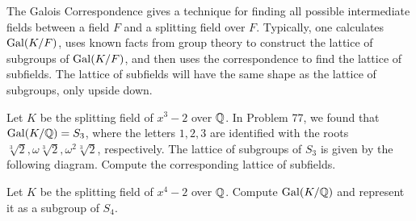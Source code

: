 The Galois Correspondence gives a technique for finding all possible intermediate fields between a field $F$ and a splitting field over $F$. Typically, one calculates $\operatorname{Gal}(K/F)$, uses known facts from group theory to construct the lattice of subgroups of $\operatorname{Gal}(K/F)$, and then uses the correspondence to find the lattice of subfields. The lattice of subfields will have the same shape as the lattice of subgroups, only upside down.

\begin{problem}
    Let $K$ be the splitting field of $x^3-2$ over $\mathbb{Q}$.
    In Problem 77, we found that $\operatorname{Gal}(K/\mathbb{Q}) = S_3$, where the letters $1,2,3$ are identified with the roots $\sqrt[3]{2}, \omega\sqrt[3]{2},\omega^2\sqrt[3]{2}$, respectively. The lattice of subgroups of $S_3$ is given by the following diagram. Compute the corresponding lattice of subfields.
\begin{center}\small
{}
\end{center}
\end{problem}



\begin{problem}\label{prob:sfx4m2}
    Let $K$ be the splitting field of $x^4-2$ over $\mathbb{Q}$. Compute $\operatorname{Gal}(K/\mathbb{Q})$ and represent it as a subgroup of $S_4$.
\end{problem}



